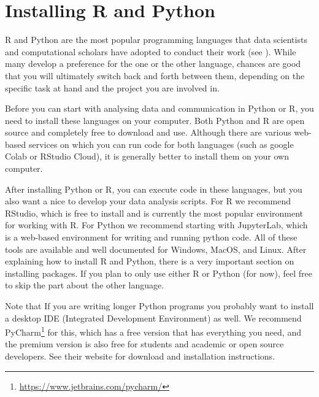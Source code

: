 \section{Installing R and Python}
\label{sec:installing}

R and Python are the most popular programming languages that data
scientists and computational scholars have adopted to conduct their
work (see ). While many develop a preference
for the one or the other language, chances are good that you
will ultimately switch back and forth between them, depending on
the specific task at hand and the project you are involved in.

Before you can start with analysing data and communication in Python or R,
you need to install these languages on your computer.
Both Python and R are open source and completely free to download and use.
Although there are various web-based services on which you can run code for both languages
(such as google Colab or RStudio Cloud),
it is generally better to install them on your own computer.

After installing Python or R, you can execute code in these languages, but you also want a nice
 to develop your data analysis scripts. 
For R we recommend RStudio, which is free to install and is currently the most popular environment for working with R.
For Python we recommend starting with JupyterLab, which is a web-based environment for writing and running python code.
All of these tools are available and well documented for Windows, MacOS, and Linux. 
After explaining how to install R and Python, there is a very important section on installing packages.
If you plan to only use either R or Python (for now), feel free to skip the part about the other language.

Note that If you are writing longer Python programs you probably want to install a desktop IDE (Integrated Development Environment)
as well.
We recommend PyCharm\footnote{\url{https://www.jetbrains.com/pycharm/}} for this, which has a free version that has everything you need, and the premium version is also free for students and academic or open source developers.
See their website for download and installation instructions.


